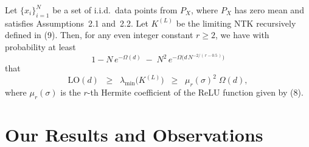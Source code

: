\documentclass[serif, aspectratio=169]{beamer}
\begin{document}
\begin{frame}
	\begin{theorem}
		\label{thm:smallest-eig-NTK}
		Let $\{x_i\}_{i=1}^N$ be a set of i.i.d.\ data points from $P_X$, where $P_X$ has 
		zero mean and satisfies Assumptions~2.1 and~2.2. Let $K^{(L)}$ be the limiting 
		NTK recursively defined in (9). Then, for any even integer constant $r \ge 2$, 
		we have with probability at least 
		\[
		1 - N\,e^{-\Omega(d)} \;-\; N^2\,e^{-\Omega\bigl(d\,N^{-2/(\,r - 0.5\,)}\bigr)}
		\]
		that
		\[
		\mathrm{LO}(d) 
		\;\;\ge\;\;
		\lambda_{\min}\bigl(K^{(L)}\bigr) 
		\;\;\ge\;\;
		\mu_{r}(\sigma)^{2}\;\Omega(d),
		\]
		where $\mu_{r}(\sigma)$ is the $r$-th Hermite coefficient of the ReLU function 
		given by (8).
	\end{theorem}
\end{frame}


\section{Our Results and Observations}
\end{document}

